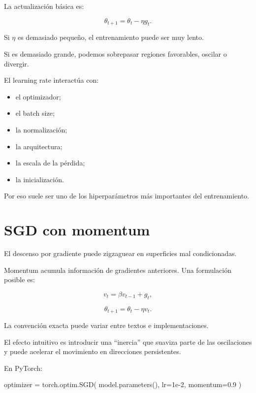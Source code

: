 \documentclass[
  letterpaper,
  DIV=11,
  numbers=noendperiod]{scrartcl}
\newenvironment{Shaded}{\begin{snugshade}}{\end{snugshade}}
\newcommand{\FloatTok}[1]{\textcolor[rgb]{0.68,0.00,0.00}{#1}}
\newcommand{\NormalTok}[1]{\textcolor[rgb]{0.00,0.23,0.31}{#1}}
\newcommand{\OperatorTok}[1]{\textcolor[rgb]{0.37,0.37,0.37}{#1}}
\providecommand{\tightlist}{%
  \setlength{\itemsep}{0pt}\setlength{\parskip}{0pt}}
\begin{document}
La actualización básica es:

\[
\theta_{t+1}
=
\theta_t-\eta g_t.
\]

Si \(\eta\) es demasiado pequeño, el entrenamiento puede ser muy lento.

Si es demasiado grande, podemos sobrepasar regiones favorables, oscilar
o divergir.

El learning rate interactúa con:

\begin{itemize}
\tightlist
\item
  el optimizador;
\item
  el batch size;
\item
  la normalización;
\item
  la arquitectura;
\item
  la escala de la pérdida;
\item
  la inicialización.
\end{itemize}

Por eso suele ser uno de los hiperparámetros más importantes del
entrenamiento.

\section{SGD con momentum}\label{sgd-con-momentum}

El descenso por gradiente puede zigzaguear en superficies mal
condicionadas.

Momentum acumula información de gradientes anteriores. Una formulación
posible es:

\[
v_t
=
\beta v_{t-1}+g_t,
\]

\[
\theta_{t+1}
=
\theta_t-\eta v_t.
\]

La convención exacta puede variar entre textos e implementaciones.

El efecto intuitivo es introducir una ``inercia'' que suaviza parte de
las oscilaciones y puede acelerar el movimiento en direcciones
persistentes.

En PyTorch:

\begin{Shaded}
\begin{Highlighting}[]
\NormalTok{optimizer }\OperatorTok{=}\NormalTok{ torch.optim.SGD(}
\NormalTok{    model.parameters(),}
\NormalTok{    lr}\OperatorTok{=}\FloatTok{1e{-}2}\NormalTok{,}
\NormalTok{    momentum}\OperatorTok{=}\FloatTok{0.9}
\NormalTok{)}
\end{Highlighting}
\end{Shaded}
\end{document}
